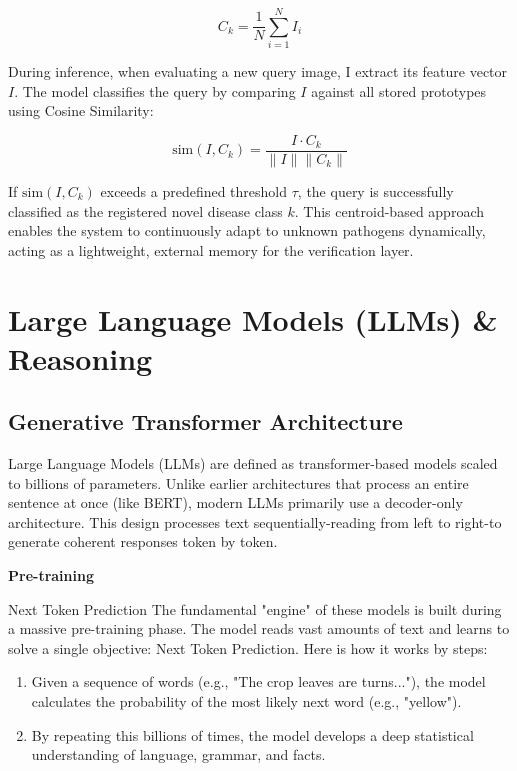 \begin{equation}
    C_k = \frac{1}{N} \sum_{i=1}^{N} I_i
\end{equation}

During inference, when evaluating a new query image, I extract its feature vector $I$. The model classifies the query by comparing $I$ against all stored prototypes using Cosine Similarity:

\begin{equation}
    \text{sim}(I, C_k) = \frac{I \cdot C_k}{\|I\| \|C_k\|}
\end{equation}

If $\text{sim}(I, C_k)$ exceeds a predefined threshold $\tau$, the query is successfully classified as the registered novel disease class $k$. This centroid-based approach enables the system to continuously adapt to unknown pathogens dynamically, acting as a lightweight, external memory for the verification layer.





\section{Large Language Models (LLMs) \& Reasoning}
\subsection{Generative Transformer Architecture}
Large Language Models (LLMs) are defined as transformer-based models scaled to billions of parameters. Unlike earlier architectures that process an entire sentence at once (like BERT), modern LLMs primarily use a decoder-only architecture. This design processes text sequentially-reading from left to right-to generate coherent responses token by token.

\textbf{Pre-training}

Next Token Prediction The fundamental "engine" of these models is built during a massive pre-training phase. The model reads vast amounts of text and learns to solve a single objective: Next Token Prediction. Here is how it works by steps:
\begin{enumerate}
	\item Given a sequence of words (e.g., "The crop leaves are turns..."), the model calculates the probability of the most likely next word (e.g., "yellow").
	\item By repeating this billions of times, the model develops a deep statistical understanding of language, grammar, and facts.
\end{enumerate}

